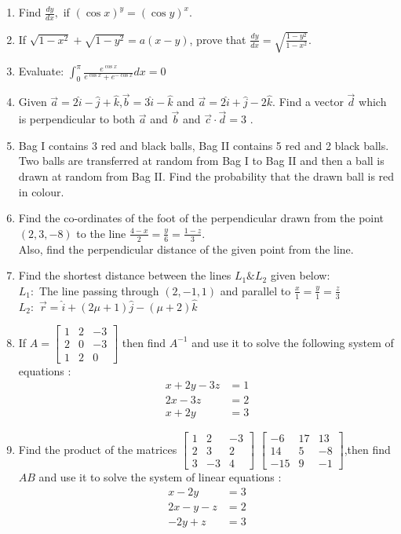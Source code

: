\documentclass{article}
\providecommand{\myvec}[1]{\ensuremath{\begin{bmatrix}#1 \end{bmatrix}}}
\begin{document}
\begin{enumerate}
\item Find $ \frac{dy}{dx},$ if $(\cos{x})^y = (\cos{y})^x.$
\item If $\sqrt{1-x^2} + \sqrt{1-y^2} =a(x-y)$, prove that $ \frac{dy}{dx}= \sqrt{\frac{1-y^2}{1-x^2}}.$



\item Evaluate: $\int_{0}^{\pi}\frac{e^{\cos{x}}}{e^{\cos{x}} + e^{-\cos{x}}}dx = 0$

\item Given $\vec{a}=2\hat{i}-\hat{j}+\hat{k}$,$\vec{b}=3\hat{i}-\hat{k}$ and $\vec{a}=2\hat{i}+\hat{j}-2\hat{k}$. Find a vector $\vec{d}$ which is perpendicular to both $\vec{a}$ and $\vec{b}$ and $\vec{c}\cdot\vec{d}=3$ .

\item Bag I contains 3 red and black balls, Bag II contains 5 red and 2 black balls. Two balls are transferred at random from Bag I to Bag II and then a ball is drawn at random from Bag II. Find the probability that the drawn ball is red in colour.


\item Find the co-ordinates of the foot of the perpendicular drawn from the point $(2,3,-8)$ to the line $\frac{4-x}{2} = \frac{y}{6} = \frac{1-z}{3}$.\\
Also, find the perpendicular distance of the given point from the line.

\item Find the shortest distance between the lines $L_{1} \& L_{2}$ given below:\\
	$L_{1}:$ The line passing through $(2,-1,1)$  and parallel to $ \frac{x}{1} = \frac{y}{1}=\frac{z}{3}$\\
		$L_{2}:$  $\vec{r}= \hat{i}+(2\mu + 1)\hat{j}-(\mu + 2)\hat{k}$


\item If $A=\myvec{ 1 & 2 & -3\\2 & 0 & -3\\1 & 2 & 0}$ then find $A^{-1}$ and use it to solve the following system of equations :
	\begin{align}  x + 2y -3z&= 1\\
		2x-3z & =2\\
                x+ 2y &=3 \end{align}

\item Find the product of the matrices $\myvec{ 1 & 2 & -3\\2 & 3 & 2\\3 & -3 & 4}$ $\myvec{  -6 & 17 & 13\\14 & 5 & -8\\-15 & 9 & -1}$,then find $AB$ and use it to solve the system of linear equations :
\begin{align} x - 2y &= 3\\2x - y - z &= 2\\-2y + z &= 3\end{align}



\end{enumerate}
\end{document}
